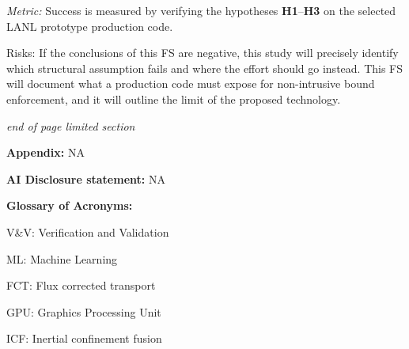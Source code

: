 \documentclass[12pt,twoside]{paper}
\begin{document}
\vspace*{0.5\baselineskip}

\textit{Metric:} Success is measured by verifying the hypotheses {\bfseries
H1}--{\bfseries H3} on the selected LANL prototype production code.

\vspace*{0.5\baselineskip}

Risks: If the conclusions of this FS are negative, this study will
precisely identify which structural assumption fails and where the effort
should go instead. This FS will document what a production code must expose
for non-intrusive bound enforcement, and it will outline the limit of the
proposed technology.

\begin{center}
\textit{end of page limited section}
\end{center}
\vspace{-0.7cm}
\noindent\makebox[\linewidth]{\rule{\paperwidth}{0.4pt}}


\clearpage %
\newpage   %


\vspace*{\baselineskip}

\textbf{Appendix:} NA
\vspace*{\baselineskip}

\textbf{AI Disclosure statement:} NA
\vspace*{\baselineskip}

\textbf{Glossary of Acronyms:}

V\&V: Verification and Validation

ML: Machine Learning

FCT: Flux corrected transport


GPU: Graphics Processing Unit

ICF: Inertial confinement fusion

\vspace*{\baselineskip}
\end{document}

